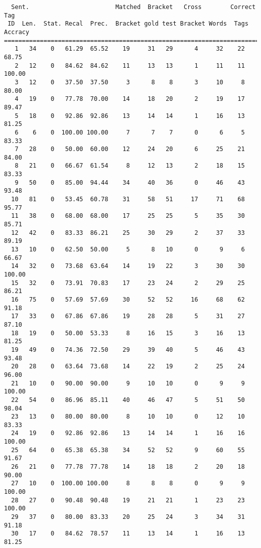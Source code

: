 \scriptsize
\begin{verbatim}
  Sent.                        Matched  Bracket   Cross        Correct Tag
 ID  Len.  Stat. Recal  Prec.  Bracket gold test Bracket Words  Tags Accracy
============================================================================
   1   34    0   61.29  65.52    19     31   29      4     32    22    68.75
   2   12    0   84.62  84.62    11     13   13      1     11    11   100.00
   3   12    0   37.50  37.50     3      8    8      3     10     8    80.00
   4   19    0   77.78  70.00    14     18   20      2     19    17    89.47
   5   18    0   92.86  92.86    13     14   14      1     16    13    81.25
   6    6    0  100.00 100.00     7      7    7      0      6     5    83.33
   7   28    0   50.00  60.00    12     24   20      6     25    21    84.00
   8   21    0   66.67  61.54     8     12   13      2     18    15    83.33
   9   50    0   85.00  94.44    34     40   36      0     46    43    93.48
  10   81    0   53.45  60.78    31     58   51     17     71    68    95.77
  11   38    0   68.00  68.00    17     25   25      5     35    30    85.71
  12   42    0   83.33  86.21    25     30   29      2     37    33    89.19
  13   10    0   62.50  50.00     5      8   10      0      9     6    66.67
  14   32    0   73.68  63.64    14     19   22      3     30    30   100.00
  15   32    0   73.91  70.83    17     23   24      2     29    25    86.21
  16   75    0   57.69  57.69    30     52   52     16     68    62    91.18
  17   33    0   67.86  67.86    19     28   28      5     31    27    87.10
  18   19    0   50.00  53.33     8     16   15      3     16    13    81.25
  19   49    0   74.36  72.50    29     39   40      5     46    43    93.48
  20   28    0   63.64  73.68    14     22   19      2     25    24    96.00
  21   10    0   90.00  90.00     9     10   10      0      9     9   100.00
  22   54    0   86.96  85.11    40     46   47      5     51    50    98.04
  23   13    0   80.00  80.00     8     10   10      0     12    10    83.33
  24   19    0   92.86  92.86    13     14   14      1     16    16   100.00
  25   64    0   65.38  65.38    34     52   52      9     60    55    91.67
  26   21    0   77.78  77.78    14     18   18      2     20    18    90.00
  27   10    0  100.00 100.00     8      8    8      0      9     9   100.00
  28   27    0   90.48  90.48    19     21   21      1     23    23   100.00
  29   37    0   80.00  83.33    20     25   24      3     34    31    91.18
  30   17    0   84.62  78.57    11     13   14      1     16    13    81.25

\end{verbatim}
